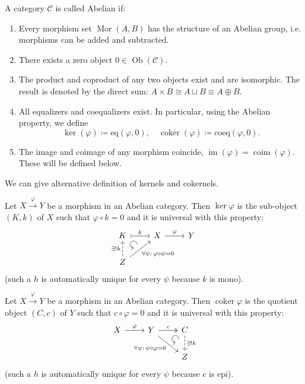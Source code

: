 \documentclass[english,letterpaper]{article}%
\numberwithin{equation}{section}
\numberwithin{figure}{section}
\numberwithin{table}{section}
\theoremstyle{definition}
\theoremstyle{definition}
\theoremstyle{definition}
\theoremstyle{plain}
\theoremstyle{plain}
\theoremstyle{plain}
\theoremstyle{plain}
\theoremstyle{remark}
\theoremstyle{remark}
\newcommand{\calC}{\mathcal{C}}
\DeclareMathOperator{\mor}{Mor}
\DeclareMathOperator{\ob}{Ob}
\DeclareMathOperator{\im}{im}
\DeclareMathOperator{\coker}{coker}
\DeclareMathOperator{\coim}{coim}
\begin{document}
\begin{defn}
    A category $\calC$ is called Abelian if:
    \begin{enumerate}
        \item Every morphism set $\mor(A,B)$ has the structure of an Abelian group, i.e. morphisms can be added and subtracted.
        \item There exists a zero object $0\in\ob(\calC)$.
        \item The product and coproduct of any two objects exist and are isomorphic. The result is denoted by the direct sum: $A\times B\cong A\sqcup B \equiv A\oplus B$.
        \item All equalizers and coequalizers exist. In particular, using the Abelian property, we define
        \[\ker (\varphi)\coloneqq\mathrm{eq}(\varphi,0),\quad \coker(\varphi)\coloneqq\mathrm{coeq}(\varphi,0).\]
        \item The image and coimage of any morphism coincide, $\im (\varphi)=\coim(\varphi)$. These will be defined below.
    \end{enumerate}
\end{defn}

We can give alternative definition of kernels and cokernels.
\begin{defn}[Kernel]
    Let $X\overset\varphi\to Y$ be a morphism in an Abelian category. Then $\ker\varphi$ is the sub-object $(K,k)$ of $X$ such that $\varphi\circ k=0$ and it is universal with this property:
    \[\begin{tikzcd}[every matrix/.append style={name=m},   
        execute at end picture={\draw [<-] ([xshift=-10mm,yshift=-8mm]m-1-2.north) arc[start angle=-90,delta angle=-270,radius=0.15cm];}]
        K \arrow[r,tail,"k"]& X\arrow[r,"\varphi"] & Y\\
        Z\arrow[u,dashed,"\exists! h"]\arrow[ur,swap,"\forall\psi:\,\varphi\circ\psi=0"]& & 
    \end{tikzcd}\]
    (such a $h$ is automatically unique for every $\psi$ because $k$ is mono).
\end{defn}

\begin{defn}[Cokernel]
    Let $X\overset\varphi\to Y$ be a morphism in an Abelian category. Then $\coker\varphi$ is the quotient object $(C,c)$ of $Y$ such that $c\circ\varphi=0$ and it is universal with this property:
    \[\begin{tikzcd}[every matrix/.append style={name=m},   
        execute at end picture={\draw [<-] ([xshift=-4mm,yshift=-8mm]m-1-3.north) arc[start angle=-90,delta angle=-270,radius=0.15cm];}]
        X\arrow[r,"\varphi"] & Y \arrow[r,two heads,"c"]\arrow[dr,swap,"\forall\psi:\,\psi\circ\varphi=0"]  & C\arrow[d,dashed,"\exists! h"] \\
        & & Z
    \end{tikzcd}\]
    (such a $h$ is automatically unique for every $\psi$ because $c$ is epi).
\end{defn}
\end{document}
